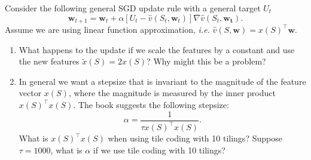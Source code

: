 Consider the following general SGD update rule with a general target $U_t$
\[
	\mathbf{w}_{t+1} = \mathbf{w}_t + \alpha \left[U_t - \hat{v}(S_t,\mathbf{w}_t)\right] \nabla \hat{v}(S_t, \mathbf{w_t}).
\]
Assume we are using linear function approximation, \emph{i.e. }
$\hat{v}(S, \mathbf{w})= x(S)^\top \mathbf{w}$.
\begin{enumerate}
	\item What happens to the update if we scale the features by a constant
		and use the new features $\tilde{x}(S) = 2x(S)$?
		 Why might this be a problem?
	\item In general we want a stepsize that is invariant to the magnitude
		of the feature vector $x(S)$, where the magnitude is measured by
		the inner product $x(S)^\top x(S)$.
		The book suggests the following 
		stepsize:
		\[
			\alpha = \frac{1}{\tau x(S)^\top x(S)}.
		\]
		What is $x(S)^\top x(S)$ when using tile coding with 
		10 tilings?
		Suppose $\tau = 1000$, what is $\alpha$ if we use tile coding
		with 10 tilings?
\end{enumerate}	
